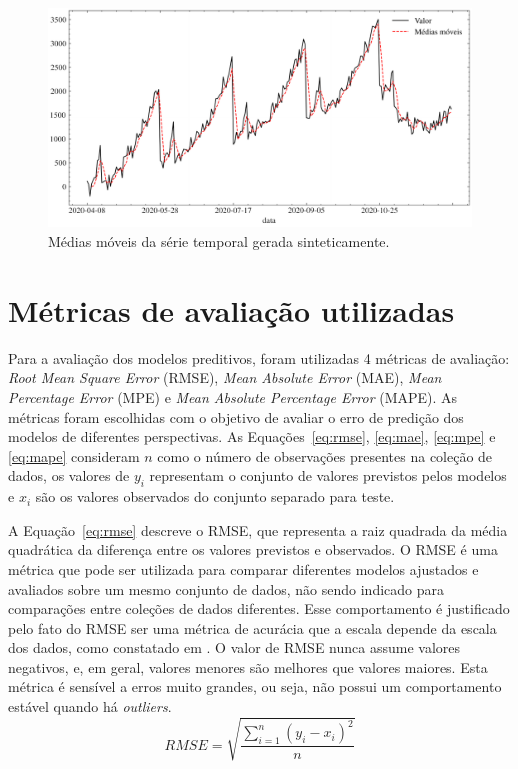 \begin{figure}[!htp]
    \centering
    \includegraphics[width=5.0in]{img/dados_sinteticos_ma.pdf}
    \caption{Médias móveis da série temporal gerada sinteticamente.}
    \label{fig:dados_sinteticos_ma}
\end{figure}

\FloatBarrier

\section{Métricas de avaliação utilizadas}

Para a avaliação dos modelos preditivos, foram utilizadas 4 métricas de avaliação: \textit{Root Mean Square Error} (RMSE), \textit{Mean Absolute Error} (MAE), \textit{Mean Percentage Error} (MPE) e \textit{Mean Absolute Percentage Error} (MAPE). As métricas foram escolhidas com o objetivo de avaliar o erro de predição dos modelos de diferentes perspectivas. As Equações~\ref{eq:rmse}, \ref{eq:mae}, \ref{eq:mpe} e \ref{eq:mape} consideram $n$ como o número de observações presentes na coleção de dados, os valores de $y_{i}$ representam o conjunto de valores previstos pelos modelos e $x_{i}$ são os valores observados do conjunto separado para teste.

A Equação~\ref{eq:rmse} descreve o RMSE, que representa a raiz quadrada da média quadrática da diferença entre os valores previstos e observados. O RMSE é uma métrica que pode ser utilizada para comparar diferentes modelos ajustados e avaliados sobre um mesmo conjunto de dados, não sendo indicado para comparações entre coleções de dados diferentes. Esse comportamento é justificado pelo fato do RMSE ser uma métrica de acurácia que a escala depende da escala dos dados, como constatado em \cite{HYNDMAN2006679}. O valor de RMSE nunca assume valores negativos, e, em geral, valores menores são melhores que valores maiores. Esta métrica é sensível a erros muito grandes, ou seja, não possui um comportamento estável quando há \textit{outliers}.
\begin{equation} \label{eq:rmse}
    RMSE=\sqrt{\dfrac{\sum ^{n}_{i=1}\left( y_{i}-x_{i}\right) ^{2}}{n}}
\end{equation}

